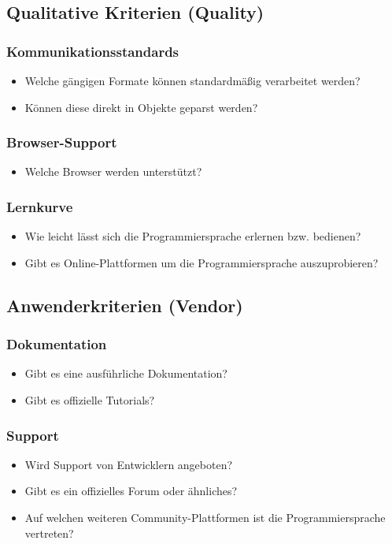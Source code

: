 \subsection{Qualitative Kriterien (Quality)}\label{sec:qualityCriteria}
\subsubsection{Kommunikationsstandards}
\begin{itemize}
	\item Welche gängigen Formate können standardmäßig verarbeitet werden?
	\item Können diese direkt in Objekte geparst werden?
\end{itemize}

\subsubsection{Browser-Support}
\begin{itemize}
	\item Welche Browser werden unterstützt?
\end{itemize}

\subsubsection{Lernkurve}
\begin{itemize}
	\item Wie leicht lässt sich die Programmiersprache erlernen bzw. bedienen?
	\item Gibt es Online-Plattformen um die Programmiersprache auszuprobieren?
\end{itemize}
 
\subsection{Anwenderkriterien (Vendor)}\label{sec:vendorCriteria}
\subsubsection{Dokumentation}
\begin{itemize}
	\item Gibt es eine ausführliche Dokumentation?
	\item Gibt es offizielle Tutorials?
\end{itemize}

\subsubsection{Support}
\begin{itemize}
	\item Wird Support von Entwicklern angeboten?
	\item Gibt es ein offizielles Forum oder ähnliches?
	\item Auf welchen weiteren Community-Plattformen ist die Programmiersprache vertreten? 
\end{itemize}

